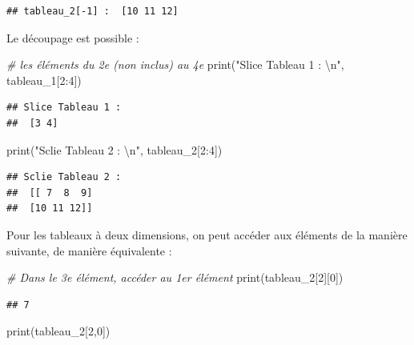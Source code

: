 \documentclass[
  12pt,
]{book}
\newenvironment{Shaded}{\begin{snugshade}}{\end{snugshade}}
\newcommand{\BuiltInTok}[1]{#1}
\newcommand{\CharTok}[1]{\textcolor[rgb]{0.31,0.60,0.02}{#1}}
\newcommand{\CommentTok}[1]{\textcolor[rgb]{0.56,0.35,0.01}{\textit{#1}}}
\newcommand{\DecValTok}[1]{\textcolor[rgb]{0.00,0.00,0.81}{#1}}
\newcommand{\NormalTok}[1]{#1}
\newcommand{\StringTok}[1]{\textcolor[rgb]{0.31,0.60,0.02}{#1}}
\numberwithin{equation}{section}
\numberwithin{countremarque}{section}
\begin{document}
\begin{lstlisting}
## tableau_2[-1] :  [10 11 12]
\end{lstlisting}

Le découpage est possible :

\begin{Shaded}
\begin{Highlighting}[]
\CommentTok{\# les éléments du 2e (non inclus) au 4e}
\BuiltInTok{print}\NormalTok{(}\StringTok{"Slice Tableau 1 : }\CharTok{\textbackslash{}n}\StringTok{"}\NormalTok{, tableau\_1[}\DecValTok{2}\NormalTok{:}\DecValTok{4}\NormalTok{])}
\end{Highlighting}
\end{Shaded}

\begin{lstlisting}
## Slice Tableau 1 : 
##  [3 4]
\end{lstlisting}

\begin{Shaded}
\begin{Highlighting}[]
\BuiltInTok{print}\NormalTok{(}\StringTok{"Sclie Tableau 2 : }\CharTok{\textbackslash{}n}\StringTok{"}\NormalTok{, tableau\_2[}\DecValTok{2}\NormalTok{:}\DecValTok{4}\NormalTok{])}
\end{Highlighting}
\end{Shaded}

\begin{lstlisting}
## Sclie Tableau 2 : 
##  [[ 7  8  9]
##  [10 11 12]]
\end{lstlisting}

Pour les tableaux à deux dimensions, on peut accéder aux éléments de la manière suivante, de manière équivalente :

\begin{Shaded}
\begin{Highlighting}[]
\CommentTok{\# Dans le 3e élément, accéder au 1er élément}
\BuiltInTok{print}\NormalTok{(tableau\_2[}\DecValTok{2}\NormalTok{][}\DecValTok{0}\NormalTok{])}
\end{Highlighting}
\end{Shaded}

\begin{lstlisting}
## 7
\end{lstlisting}

\begin{Shaded}
\begin{Highlighting}[]
\BuiltInTok{print}\NormalTok{(tableau\_2[}\DecValTok{2}\NormalTok{,}\DecValTok{0}\NormalTok{])}
\end{Highlighting}
\end{Shaded}
\end{document}
